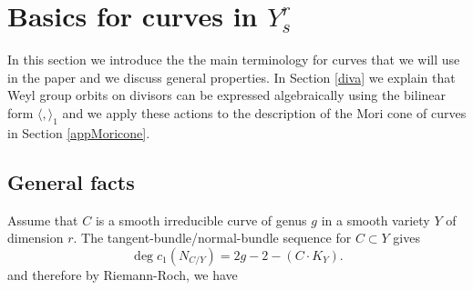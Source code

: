 \documentclass[12pt]{article}
\numberwithin{equation}{section}
\numberwithin{subeq}{equation}
\def\mod{\text{mod}\;}
\begin{document}

\section{Basics for curves in $Y^r_s$}\label{SectionBasicsCurves}
In this section we introduce the the main terminology for curves that we will use in the paper
and we discuss general properties.
In Section \ref{diva} we explain that Weyl group orbits on divisors can be expressed algebraically using the bilinear form $\langle,  \rangle_1$ and we apply these actions to the description of the Mori cone of curves in Section \ref{appMoricone}.

\subsection{General facts}\label{gen}

Assume that $C$ is a smooth irreducible curve of genus $g$
in a smooth variety $Y$ of dimension $r$. The tangent-bundle/normal-bundle sequence for $C \subset Y$ gives
\begin{equation}\label{c1Nformula}
\deg c_1(N_{C/Y}) = 2g-2 - (C \cdot K_Y).
\end{equation}
and therefore by Riemann-Roch, we have
\end{document}
